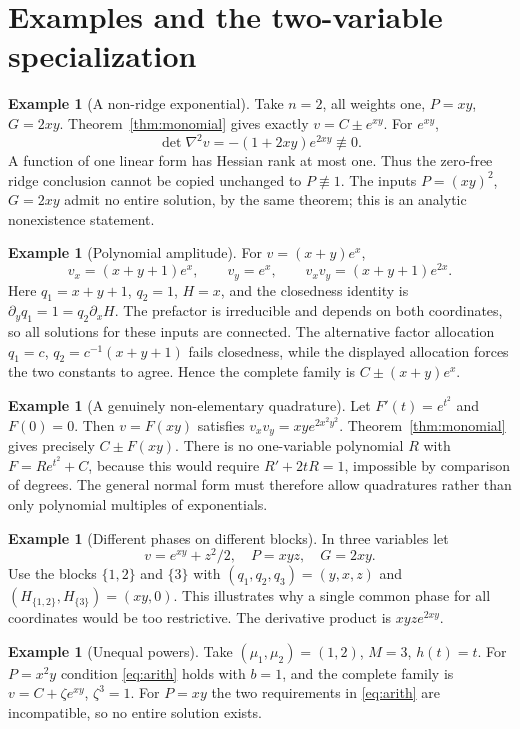 \documentclass[11pt]{article}
\numberwithin{equation}{section}
\theoremstyle{definition}\newtheorem{definition}[theorem]{Definition}
\newtheorem{example}[theorem]{Example}
\theoremstyle{remark}\newtheorem{remark}[theorem]{Remark}
\begin{document}
\section{Examples and the two-variable specialization}
\begin{example}[A non-ridge exponential]
Take $n=2$, all weights one, $P=xy$, $G=2xy$. Theorem~\ref{thm:monomial}
gives exactly $v=C\pm e^{xy}$. For $e^{xy}$,
\[
 \det\nabla^2v=-(1+2xy)e^{2xy}\not\equiv0.
\]
A function of one linear form has Hessian rank at most one. Thus the
zero-free ridge conclusion cannot be copied unchanged to $P\not\equiv1$.
The inputs $P=(xy)^2$, $G=2xy$ admit no entire solution, by the same
theorem; this is an analytic nonexistence statement.
\end{example}

\begin{example}[Polynomial amplitude]
For $v=(x+y)e^x$,
\[
 v_x=(x+y+1)e^x,\qquad v_y=e^x,\qquad
 v_xv_y=(x+y+1)e^{2x}.
\]
Here $q_1=x+y+1$, $q_2=1$, $H=x$, and the closedness identity is
$\partial_yq_1=1=q_2\partial_xH$. The prefactor is irreducible and
depends on both coordinates, so all solutions for these inputs are
connected. The alternative factor allocation $q_1=c$, $q_2=c^{-1}(x+y+1)$
fails closedness, while the displayed allocation forces the two constants
to agree. Hence the complete family is $C\pm(x+y)e^x$.
\end{example}

\begin{example}[A genuinely non-elementary quadrature]
Let $F'(t)=e^{t^2}$ and $F(0)=0$. Then $v=F(xy)$ satisfies
$v_xv_y=xy e^{2x^2y^2}$. Theorem~\ref{thm:monomial} gives precisely
$C\pm F(xy)$. There is no one-variable polynomial $R$ with
$F=Re^{t^2}+C$, because this would require $R'+2tR=1$, impossible by
comparison of degrees. The general normal form must therefore allow
quadratures rather than only polynomial multiples of exponentials.
\end{example}

\begin{example}[Different phases on different blocks]
In three variables let
\[
 v=e^{xy}+z^2/2,
 \quad P=xyz,\quad G=2xy.
\]
Use the blocks $\{1,2\}$ and $\{3\}$ with
$(q_1,q_2,q_3)=(y,x,z)$ and $(H_{\{1,2\}},H_{\{3\}})=(xy,0)$.
This illustrates why a single common phase for all coordinates would be
too restrictive. The derivative product is $xyz e^{2xy}$.
\end{example}

\begin{example}[Unequal powers]
Take $(\mu_1,\mu_2)=(1,2)$, $M=3$, $h(t)=t$.
For $P=x^2y$ condition \eqref{eq:arith} holds with $b=1$, and the
complete family is $v=C+\zeta e^{xy}$, $\zeta^3=1$.
For $P=xy$ the two requirements in \eqref{eq:arith} are incompatible,
so no entire solution exists.
\end{example}
\end{document}
